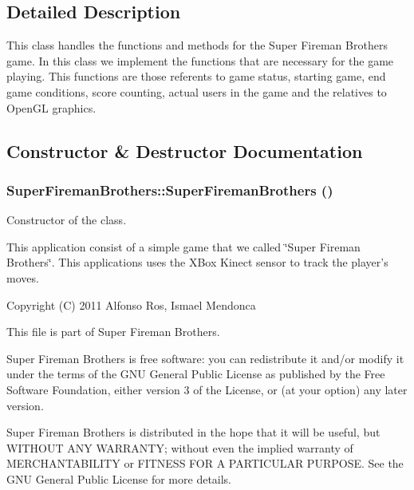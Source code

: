 \subsection{Detailed Description}
This class handles the functions and methods for the Super Fireman Brothers game. In this class we implement the functions that are necessary for the game playing. This functions are those referents to game status, starting game, end game conditions, score counting, actual users in the game and the relatives to OpenGL graphics. 

\subsection{Constructor \& Destructor Documentation}
\hypertarget{classSuperFiremanBrothers_abe477c6e372321590553ff470df34a54}{
\subsubsection[{SuperFiremanBrothers}]{\setlength{\rightskip}{0pt plus 5cm}SuperFiremanBrothers::SuperFiremanBrothers ()}}
\label{classSuperFiremanBrothers_abe477c6e372321590553ff470df34a54}
Constructor of the class.

This application consist of a simple game that we called \char`\"{}Super Fireman Brothers\char`\"{}. This applications uses the XBox Kinect sensor to track the player's moves.

Copyright (C) 2011 Alfonso Ros, Ismael Mendonca

This file is part of Super Fireman Brothers.

Super Fireman Brothers is free software: you can redistribute it and/or modify it under the terms of the GNU General Public License as published by the Free Software Foundation, either version 3 of the License, or (at your option) any later version.

Super Fireman Brothers is distributed in the hope that it will be useful, but WITHOUT ANY WARRANTY; without even the implied warranty of MERCHANTABILITY or FITNESS FOR A PARTICULAR PURPOSE. See the GNU General Public License for more details.

